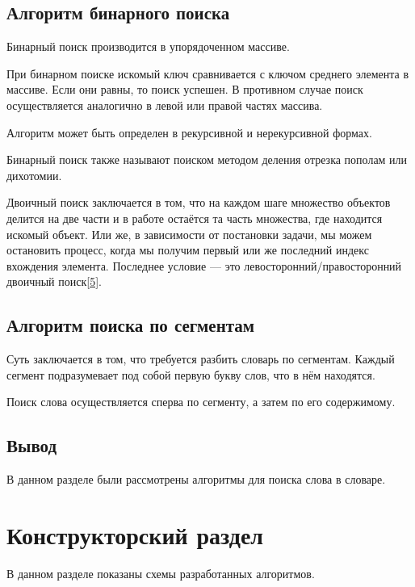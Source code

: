 \documentclass[14pt, a4paper]{extarticle}
\begin{document}
	\subsection{Алгоритм бинарного поиска}
	Бинарный поиск производится в упорядоченном массиве.\par	
	При бинарном поиске искомый ключ сравнивается с ключом среднего элемента в массиве. Если они равны, то поиск успешен. В противном случае поиск осуществляется аналогично в левой или правой частях массива.\par	
	Алгоритм может быть определен в рекурсивной и нерекурсивной формах.\par
	Бинарный поиск также называют поиском методом деления отрезка пополам или дихотомии.\par
	Двоичный поиск заключается в том, что на каждом шаге множество объектов делится на две части и в работе остаётся та часть множества, где находится искомый объект. Или же, в зависимости от постановки задачи, мы можем остановить процесс, когда мы получим первый или же последний индекс вхождения элемента. Последнее условие — это левосторонний/правосторонний двоичный поиск\hyperref[Litre]{[5]}.
	
	\subsection{Алгоритм поиска по сегментам}
	Суть заключается в том, что требуется разбить словарь по сегментам. Каждый сегмент подразумевает под собой первую букву слов, что в нём находятся.\par
	Поиск слова осуществляется сперва по сегменту, а затем по его содержимому.
	
	\subsection*{Вывод}
	В данном разделе были рассмотрены алгоритмы для поиска слова в словаре.
	
	\clearpage
	\section{Конструкторский раздел}
	В данном разделе показаны схемы разработанных алгоритмов.
	
\end{document}
